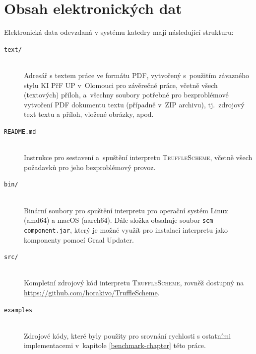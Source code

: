 \documentclass[
  master,
  biblatex,
  figures=true,
  theorems,
  sourcecodes,
  glossaries,
  index
]{kidiplom}
\begin{document}

\section{Obsah elektronických dat} \label{sec:ObsahData}

Elektronická data odevzdaná v systému katedry mají následující strukturu:

\begin{description}

\item[\texttt{text/}] \hfill \\
  Adresář s textem práce ve formátu PDF, vytvořený s~použitím
  závazného stylu KI PřF UP v~Olomouci pro závěrečné práce, včetně
  všech (textových) příloh, a~všechny soubory potřebné pro
  bezproblémové vytvoření PDF dokumentu textu (případně v~ZIP
  archivu), tj.~zdrojový text textu a příloh, vložené obrázky, apod.

\item[\texttt{README.md}] \hfill \\
  Instrukce pro sestavení a~spuštění interpretu \textsc{TruffleScheme}, včetně
  všech požadavků pro jeho bezproblémový provoz.

\item[\texttt{bin/}] \hfill \\
  Binární soubory pro spuštění interpretu pro operační systém Linux (amd64) a macOS (aarch64). Dále složka obsahuje soubor \texttt{scm-component.jar}, který je možné využít pro instalaci interpretu jako komponenty pomocí Graal Updater. 

\item[\texttt{src/}] \hfill \\
  Kompletní zdrojový kód interpretu \textsc{TruffleScheme}, rovněž dostupný na \url{https://github.com/horakivo/TruffleScheme}.

\item[\texttt{examples}] \hfill \\
  Zdrojové kódy, které byly použity pro srovnání rychlosti s ostatními implementacemi v~kapitole \ref{benchmark-chapter} této práce.

\end{description}
\end{document}
